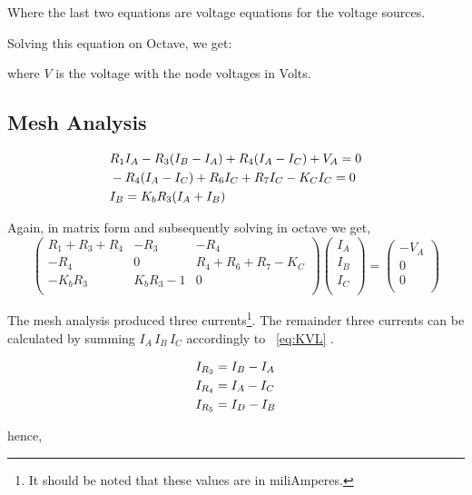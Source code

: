 Where the last two equations are voltage equations for the voltage sources. 

Solving this equation on Octave, we get:



where $V$ is the voltage with the node voltages in Volts. 

\subsection{Mesh Analysis}
\begin{align}
\centering
    &R_1I_A-R_3(I_B-I_A)+R_4(I_A-I_C)+V_A=0\\
    &-R_4(I_A-I_C)+R_6I_C+R_7I_C-K_CI_C=0\\
    &I_B=K_bR_3(I_A+I_B)
    \label{eq:KVL}
\end{align}


Again, in matrix form and subsequently solving in octave we get, 
\begin{equation}
\begin{pmatrix}
R_1 + R_3 + R_4 & -R_3 & -R_4\\
-R_4 & 0 & R_4 + R_6 + R_7 - K_C\\
-K_bR_3 & K_bR_3 - 1 & 0\\

\end{pmatrix}
\begin{pmatrix}
I_A\\
I_B\\
I_C\\
\end{pmatrix}
=
\begin{pmatrix}
-V_A\\
0\\
0\\
\end{pmatrix}
\label{eq:MatrixKVL}
\end{equation}




The mesh analysis produced three currents\footnote{It should be noted that these values are in miliAmperes.}. The remainder three currents can be calculated by summing $I_A\, I_B\, I_C$ accordingly to ~\ref{eq:KVL} . 

\begin{align}
\centering
 	I_{R_3} &=  I_B-I_A\\
 	I_{R_4} &= I_A - I_C\\
 	I_{R_5} &= I_D - I_B
    \label{eq:RCurrents}
\end{align}

hence, 







